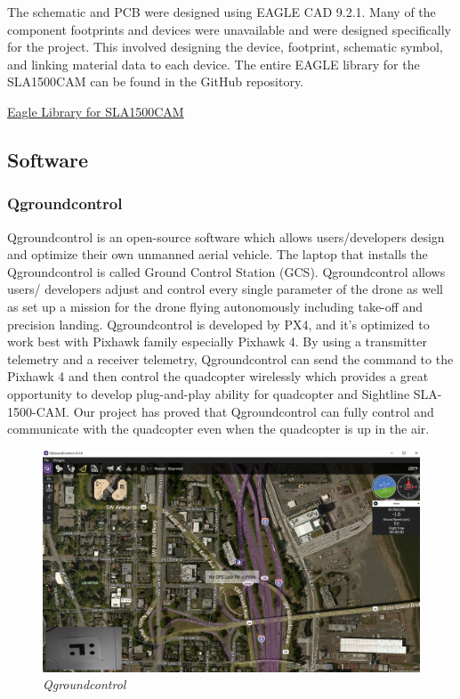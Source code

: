 \documentclass[11pt]{article}
\begin{document}
The schematic and PCB were designed using EAGLE CAD 9.2.1. Many of the component footprints and devices were unavailable and were designed specifically for the project. This involved designing the device, footprint, schematic symbol, and linking material data to each device. The entire EAGLE library for the SLA1500CAM can be found in the GitHub repository.

\href{https://github.com/phamtaiece/Capstone-Sightline/tree/master/EAGLE\%20files/Library}{Eagle Library for SLA1500CAM}





\subsection{Software}

\subsubsection{Qgroundcontrol}
Qgroundcontrol is an open-source software which allows users/developers design and optimize their own unmanned aerial vehicle. The laptop that installs the Qgroundcontrol is called Ground Control Station (GCS). Qgroundcontrol allows users/ developers adjust and control every single parameter of the drone as well as set up a mission for the drone flying autonomously including take-off and precision landing. Qgroundcontrol is developed by PX4, and it's optimized to work best with Pixhawk family especially Pixhawk 4. By using a transmitter telemetry and a receiver telemetry, Qgroundcontrol can send the command to the Pixhawk 4 and then control the quadcopter wirelessly which provides a great opportunity to develop  plug-and-play ability for quadcopter and Sightline SLA-1500-CAM. \newline
Our project has proved that Qgroundcontrol can fully control and communicate with the quadcopter even when the quadcopter is up in the air.  

\begin{figure}[h!bt]
\centering
\includegraphics[width=4.5 in]{Qgroundcontrol}
\caption{\textit{Qgroundcontrol}}	
\end{figure}
\end{document}
